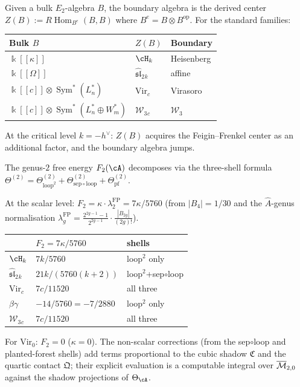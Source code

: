 \begin{construction}
\label{constr:boundary-from-bulk}
Given a bulk $E_2$-algebra $B$, the boundary algebra is the
derived center
$Z(B):=R\!\operatorname{Hom}_{B^e}(B,B)$
where $B^e=B\otimes B^{\mathrm{op}}$. For the standard families:
\begin{center}
\renewcommand{\arraystretch}{1.15}
\begin{tabular}{lll}
\textbf{Bulk $B$} & \textbf{$Z(B)$} & \textbf{Boundary} \\
\hline
$\Bbbk[[\kappa]]$ & $\cH_k$ & Heisenberg \\
$\Bbbk[[\Omega]]$ & $\widehat{\mathfrak{sl}}_2{}_k$ & affine \\
$\Bbbk[[c]]\otimes\operatorname{Sym}^*(L_n^*)$
 & $\mathrm{Vir}_c$ & Virasoro \\
$\Bbbk[[c]]\otimes\operatorname{Sym}^*(L_n^*\oplus W_m^*)$
 & $\mathcal W_3{}_c$ & $\mathcal W_3$
\end{tabular}
\end{center}
At the critical level $k=-h^\vee$: $Z(B)$ acquires the
Feigin--Frenkel center as an additional factor, and the
boundary algebra jumps.
\end{construction}

\begin{computation}
\label{comp:genus2-partition-function}
The genus-$2$ free energy $F_2(\cA)$ decomposes via the
three-shell formula
$\Theta^{(2)}=\Theta^{(2)}_{\mathrm{loop}^2}
+\Theta^{(2)}_{\mathrm{sep}\circ\mathrm{loop}}
+\Theta^{(2)}_{\mathrm{pf}}$.

At the scalar level:
$F_2=\kappa\cdot\lambda_2^{\mathrm{FP}}=7\kappa/5760$
(from $|B_4|=1/30$ and the $\hat{A}$-genus normalisation
$\lambda_g^{\mathrm{FP}} = \tfrac{2^{2g-1}-1}{2^{2g-1}}
\cdot\tfrac{|B_{2g}|}{(2g)!}$).

\begin{center}
\renewcommand{\arraystretch}{1.2}
\begin{tabular}{lll}
& $F_2=7\kappa/5760$ & shells \\
\hline
$\cH_k$ & $7k/5760$ & loop$^2$ only \\
$\widehat{\mathfrak{sl}}_2{}_k$
 & $21k/(5760(k{+}2))$
 & loop$^2$+sep$\circ$loop \\
$\mathrm{Vir}_c$ & $7c/11520$
 & all three \\
$\beta\gamma$ & $-14/5760=-7/2880$ & loop$^2$ only \\
$\mathcal W_3{}_c$ & $7c/11520$
 & all three
\end{tabular}
\end{center}
For $\mathrm{Vir}_{0}$: $F_2=0$ ($\kappa=0$).
The non-scalar corrections (from the sep$\circ$loop and
planted-forest shells) add terms proportional to the cubic
shadow $\mathfrak C$ and the quartic contact $\mathfrak Q$;
their explicit evaluation is a computable integral over
$\overline{\mathcal M}_{2,0}$ against the shadow projections of
$\Theta_\cA$.
\end{computation}

